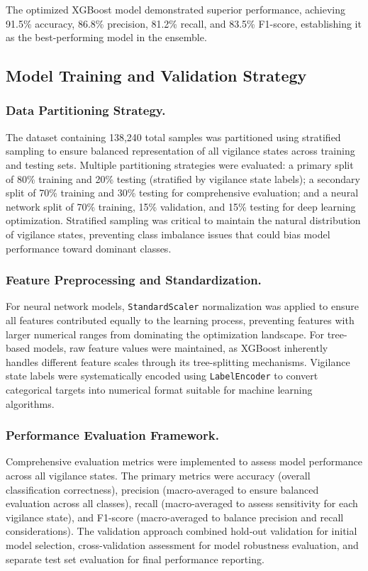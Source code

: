 \documentclass[letterpaper]{article} %
\begin{document}
The optimized XGBoost model demonstrated superior performance, achieving 91.5\% accuracy, 86.8\% precision, 81.2\% recall, and 83.5\% F1-score, establishing it as the best-performing model in the ensemble.

\subsection{Model Training and Validation Strategy}

\subsubsection{Data Partitioning Strategy.}
The dataset containing 138,240 total samples was partitioned using stratified sampling to ensure balanced representation of all vigilance states across training and testing sets. Multiple partitioning strategies were evaluated: a primary split of 80\% training and 20\% testing (stratified by vigilance state labels); a secondary split of 70\% training and 30\% testing for comprehensive evaluation; and a neural network split of 70\% training, 15\% validation, and 15\% testing for deep learning optimization. Stratified sampling was critical to maintain the natural distribution of vigilance states, preventing class imbalance issues that could bias model performance toward dominant classes.

\subsubsection{Feature Preprocessing and Standardization.}
For neural network models, \texttt{StandardScaler} normalization was applied to ensure all features contributed equally to the learning process, preventing features with larger numerical ranges from dominating the optimization landscape. For tree-based models, raw feature values were maintained, as XGBoost inherently handles different feature scales through its tree-splitting mechanisms. Vigilance state labels were systematically encoded using \texttt{LabelEncoder} to convert categorical targets into numerical format suitable for machine learning algorithms.

\subsubsection{Performance Evaluation Framework.}
Comprehensive evaluation metrics were implemented to assess model performance across all vigilance states. The primary metrics were accuracy (overall classification correctness), precision (macro-averaged to ensure balanced evaluation across all classes), recall (macro-averaged to assess sensitivity for each vigilance state), and F1-score (macro-averaged to balance precision and recall considerations). The validation approach combined hold-out validation for initial model selection, cross-validation assessment for model robustness evaluation, and separate test set evaluation for final performance reporting.
\end{document}

